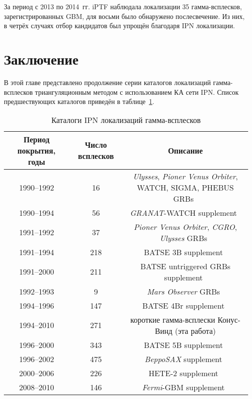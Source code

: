За период с 2013 по 2014~гг. iPTF наблюдала локализации 35 гамма-всплесков, зарегистрированных GBM,
для восьми было обнаружено послесвечение. Из них, в четрёх случаях отбор кандидатов
был упрощён благодаря IPN локализации.


\section{Заключение}
В этой главе представлено продолжение серии каталогов локализаций гамма-всплесков 
триангуляционным методом с использованием КА сети IPN. Список предшествующих каталогов 
приведён в таблице~\ref{tab:IPN_cat}.

\begin{table} [h]
 \centering
 \caption{Каталоги IPN локализаций гамма-всплесков}\label{tab:IPN_cat}
\scriptsize
  \begin{center}
  \begin{tabular}{ccc}
  \hline
  \hline
  Период покрытия, годы & Число всплесков & Описание \\
  \hline
1990--1992 &16 &\textit{Ulysses}, \textit{Pioner Venus Orbiter}, WATCH, SIGMA, PHEBUS GRBs~\citep{Hurley_2000ApJ} \\
1990--1994 &56 &\textit{GRANAT}-WATCH supplement~\citep{Hurley_2000ApJS_WATCH} \\
1991--1992 &37 &\textit{Pioner Venus Orbiter}, \textit{CGRO}, \textit{Ulysses} GRBs~\citep{Laros_1998ApJS}\\
1991--1994 &218 &BATSE 3B supplement~\citep{Hurley_1999ApJSa}\\
1991--2000 &211 &BATSE untriggered GRBs supplement~\citep{Hurley_2005ApJS_BATSE_untrig}\\
1992--1993 &9 &\textit{Mars Observer} GRBs~\citep{Laros_1997ApJS}\\
1994--1996 &147 &BATSE 4Br supplement~\citep{Hurley_1999ApJS_BATSE_4Br}\\
1994--2010 &271 &короткие гамма-всплески Конус-Винд (эта работа)\\
1996--2000 &343 &BATSE 5B supplement~\citep{Hurley_2011ApJS_BATSE_5B}\\
1996--2002 &475 &\textit{BeppoSAX} supplement~\citep{Hurley_2010ApJS_BeppoSAX}\\
2000--2006 &226 &HETE-2 supplement~\citep{Hurley_2011ApJS_HETE2}\\
2008--2010 &146 &\textit{Fermi}-GBM supplement~\citep{Hurley_2013ApJS_GBM}\\
  \hline
  \hline
  \end{tabular}
  \end{center}
\end{table}

